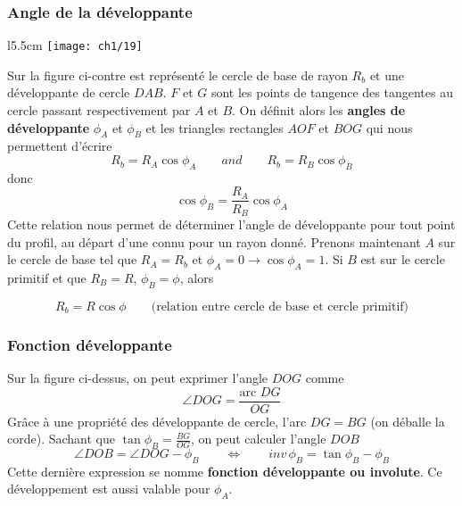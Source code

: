 \subsubsection{Angle de la développante}
\begin{wrapfigure}[12]{l}{5.5cm}
	\vspace{-5mm}
	\texttt{[image: ch1/19]}
\end{wrapfigure}
Sur la figure ci-contre est représenté le cercle de base de rayon $R_b$ et une développante de cercle $DAB$. $F$ et $G$ sont les points de tangence des tangentes au cercle passant respectivement par $A$ et $B$. On définit alors les \textbf{angles de développante} $\phi _A$ et $\phi _B$ et les triangles rectangles $AOF$ et $BOG$ qui nous permettent d'écrire
\begin{equation}
	R_b = R_A \cos \phi _A \qquad and \qquad R_b = R_B \cos \phi _B
\end{equation}
donc 
\begin{equation}
	\cos \phi _B = \frac{R_A}{R_B} \cos \phi _A
\end{equation}
Cette relation nous permet de déterminer l'angle de développante pour tout point du profil, au départ d'une connu pour un rayon donné. Prenons maintenant $A$ sur le cercle de base tel que $R_A = R_b$ et $\phi _A = 0 \rightarrow \cos \phi _A = 1$. Si $B$ est sur le cercle primitif et que $R_B = R$, $\phi _B = \phi$, alors 
	
\begin{equation}
	R_b = R \cos \phi \qquad \mbox{(relation entre cercle de base et cercle primitif)}
\end{equation}	 
	
\subsubsection{Fonction développante}
Sur la figure ci-dessus, on peut exprimer l'angle $DOG$ comme
\begin{equation}
	\angle DOG = \frac{\mbox{arc } DG}{OG}
\end{equation}
Grâce à une propriété des développante de cercle, l'arc $DG = BG$ (on déballe la corde). Sachant que $\tan \phi _B = \frac{BG}{OG}$, on peut calculer l'angle $DOB$ 
\begin{equation}
	\angle DOB = \angle DOG - \phi _B \qquad \Leftrightarrow \qquad inv \, \phi _B= \tan \phi _B - \phi _B
	\label{equation:1.7}
\end{equation}
Cette dernière expression se nomme \textbf{fonction développante ou involute}. Ce développement est aussi valable pour $\phi _A$.
	

